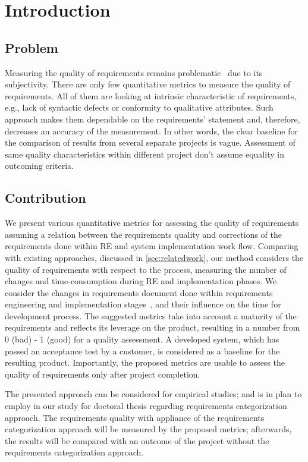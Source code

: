 \section{Introduction}
\label{sec:Intro} 

\subsection{Problem}
Measuring the quality of requirements remains problematic~\cite{Fernandez2016} due to its subjectivity.
There are only few quantitative metrics to measure the quality of requirements. 
All of them are looking at intrinsic characteristic of requirements, e.g., lack of syntactic defects 
or conformity to qualitative attributes. Such approach makes them dependable on the requirements' statement and, 
therefore, decreases an accuracy of the measurement. In other words, the clear baseline for the comparison of results 
from several separate projects is vague. Assessment of same quality characteristics within different project don't assume equality in outcoming criteria.  


\subsection{Contribution}
We present various quantitative metrics for assessing the quality of requirements assuming a relation 
between the requirements quality and corrections of the requirements done within RE and system implementation work flow. 
Comparing with existing approaches, discussed in \autoref{sec:relatedwork}, our method considers the quality of 
requirements with respect to the process, measuring the number of changes and time-consumption during RE and 
implementation phases. We consider the changes in requirements document done within 
requirements engineering and implementation stages~\cite{FARBEY:1990}, and their influence on the time 
for development process. The suggested metrics take into account a maturity of the requirements 
and reflects its leverage on the product, resulting in a number from 0 (bad) - 1 (good) for a quality assessment.  
A developed system, which has passed an acceptance test by a customer, is considered as a baseline 
for the resulting product. Importantly, the proposed metrics are usable to assess the quality of requirements 
only after project completion. 

The presented approach can be considered for empirical studies; and is in plan to employ in our study 
for doctoral thesis regarding requirements categorization approach. The requirements quality with appliance of the requirements categorization approach will be measured by the proposed metrics; afterwards, the results will be compared with an outcome of the project without the requirements categorization approach.